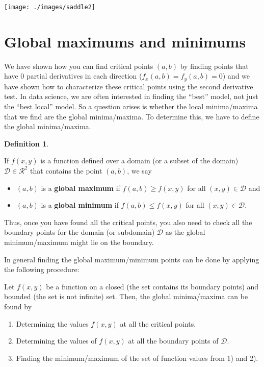 \documentclass[
]{book}
\theoremstyle{definition}
\newtheorem{definition}{Definition}[chapter]
\theoremstyle{definition}
\theoremstyle{definition}
\theoremstyle{remark}
\begin{document}
\texttt{[image: ./images/saddle2]}

\hypertarget{global-maximums-and-minimums}{%
\section{Global maximums and minimums}\label{global-maximums-and-minimums}}

We have shown how you can find critical points \((a, b)\) by finding points that have 0 partial derivatives in each direction (\(f_x(a, b) = f_y(a, b) = 0\)) and we have shown how to characterize these critical points using the second derivative test. In data science, we are often interested in finding the ``best'' model, not just the ``best local'' model. So a question arises is whether the local minima/maxima that we find are the global minima/maxima. To determine this, we have to define the global minima/maxima.

\begin{definition}
\protect\hypertarget{def:unlabeled-div-227}{}\label{def:unlabeled-div-227}

If \(f(x, y)\) is a function defined over a domain (or a subset of the domain) \(\mathcal{D} \in \mathcal{R}^2\) that contains the point \((a, b)\), we say

\begin{itemize}
\item
  \((a, b)\) is a \textbf{global maximum} if \(f(a, b) \geq f(x, y)\) for all \((x, y) \in \mathcal{D}\) and
\item
  \((a, b)\) is a \textbf{global minimum} if \(f(a, b) \leq f(x, y)\) for all \((x, y) \in \mathcal{D}\).
\end{itemize}

\end{definition}

Thus, once you have found all the critical points, you also need to check all the boundary points for the domain (or subdomain) \(\mathcal{D}\) as the global minimum/maximum might lie on the boundary.

In general finding the global maximum/minimum points can be done by applying the following procedure:

Let \(f(x, y)\) be a function on a closed (the set contains its boundary points) and bounded (the set is not infinite) set. Then, the global minima/maxima can be found by

\begin{enumerate}
\def\labelenumi{\arabic{enumi})}
\item
  Determining the values \(f(x, y)\) at all the critical points.
\item
  Determining the values of \(f(x, y)\) at all the boundary points of \(\mathcal{D}\).
\item
  Finding the minimum/maximum of the set of function values from 1) and 2).
\end{enumerate}
\end{document}
